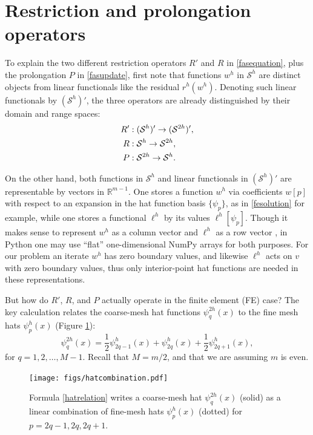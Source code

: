\documentclass[letterpaper,final,12pt,reqno]{amsart}
\newcommand{\RR}{\mathbb{R}}
\begin{document}
\section{Restriction and prolongation operators} \label{sec:restrictionprolongation}

To explain the two different restriction operators $R'$ and $R$ in \eqref{fasequation}, plus the prolongation $P$ in \eqref{fasupdate}, first note that functions $w^h$ in $\mathcal{S}^h$ are distinct objects from linear functionals like the residual $r^h(w^h)$.  Denoting such linear functionals by $(\mathcal{S}^h)'$, the three operators are already distinguished by their domain and range spaces:
\begin{align}
  R' &: (\mathcal{S}^h)' \to (\mathcal{S}^{2h})', \label{rpoperators} \\
  R  &: \mathcal{S}^h \to \mathcal{S}^{2h}, \notag \\
  P  &: \mathcal{S}^{2h} \to \mathcal{S}^h. \notag
\end{align}

On the other hand, both functions in $\mathcal{S}^h$ and linear functionals in $(\mathcal{S}^h)'$ are representable by vectors in $\RR^{m-1}$.  One stores a function $w^h$ via coefficients $w[p]$ with respect to an expansion in the hat function basis $\{\psi_p\}$, as in \eqref{fesolution} for example, while one stores a functional $\ell^h$ by its values $\ell^h[\psi_p]$.  Though it makes sense to represent $w^h$ as a column vector and $\ell^h$ as a row vector \cite{TrefethenBau1997}, in Python one may use ``flat'' one-dimensional NumPy arrays for both purposes.  For our problem an iterate $w^h$ has zero boundary values, and likewise $\ell^h$ acts on $v$ with zero boundary values, thus only interior-point hat functions are needed in these representations.

But how do $R'$, $R$, and $P$ actually operate in the finite element (FE) case?  The key calculation relates the coarse-mesh hat functions $\psi_q^{2h}(x)$ to the fine mesh hats $\psi_p^h(x)$ (Figure \ref{fig:hatcombination}):
\begin{equation}
  \psi_q^{2h}(x) = \frac{1}{2} \psi_{2q-1}^h(x) + \psi_{2q}^h(x) + \frac{1}{2} \psi_{2q+1}^h(x), \label{hatrelation}
\end{equation}
for $q=1,2,\dots,M-1$.  Recall that $M=m/2$, and that we are assuming $m$ is even.

\begin{figure}
\texttt{[image: figs/hatcombination.pdf]}
\caption{Formula \eqref{hatrelation} writes a coarse-mesh hat $\psi_q^{2h}(x)$ (solid) as a linear combination of fine-mesh hats $\psi_p^h(x)$ (dotted) for $p=2q-1,2q,2q+1$.}
\label{fig:hatcombination}
\end{figure}
\end{document}
